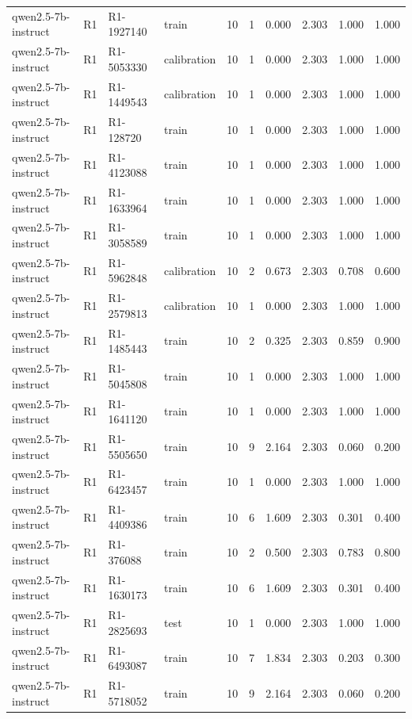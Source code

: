 \begin{table}
\begin{tabular}{llllrrrrrr}
qwen2.5-7b-instruct & R1 & R1-1927140 & train & 10 & 1 & 0.000 & 2.303 & 1.000 & 1.000 \\
qwen2.5-7b-instruct & R1 & R1-5053330 & calibration & 10 & 1 & 0.000 & 2.303 & 1.000 & 1.000 \\
qwen2.5-7b-instruct & R1 & R1-1449543 & calibration & 10 & 1 & 0.000 & 2.303 & 1.000 & 1.000 \\
qwen2.5-7b-instruct & R1 & R1-128720 & train & 10 & 1 & 0.000 & 2.303 & 1.000 & 1.000 \\
qwen2.5-7b-instruct & R1 & R1-4123088 & train & 10 & 1 & 0.000 & 2.303 & 1.000 & 1.000 \\
qwen2.5-7b-instruct & R1 & R1-1633964 & train & 10 & 1 & 0.000 & 2.303 & 1.000 & 1.000 \\
qwen2.5-7b-instruct & R1 & R1-3058589 & train & 10 & 1 & 0.000 & 2.303 & 1.000 & 1.000 \\
qwen2.5-7b-instruct & R1 & R1-5962848 & calibration & 10 & 2 & 0.673 & 2.303 & 0.708 & 0.600 \\
qwen2.5-7b-instruct & R1 & R1-2579813 & calibration & 10 & 1 & 0.000 & 2.303 & 1.000 & 1.000 \\
qwen2.5-7b-instruct & R1 & R1-1485443 & train & 10 & 2 & 0.325 & 2.303 & 0.859 & 0.900 \\
qwen2.5-7b-instruct & R1 & R1-5045808 & train & 10 & 1 & 0.000 & 2.303 & 1.000 & 1.000 \\
qwen2.5-7b-instruct & R1 & R1-1641120 & train & 10 & 1 & 0.000 & 2.303 & 1.000 & 1.000 \\
qwen2.5-7b-instruct & R1 & R1-5505650 & train & 10 & 9 & 2.164 & 2.303 & 0.060 & 0.200 \\
qwen2.5-7b-instruct & R1 & R1-6423457 & train & 10 & 1 & 0.000 & 2.303 & 1.000 & 1.000 \\
qwen2.5-7b-instruct & R1 & R1-4409386 & train & 10 & 6 & 1.609 & 2.303 & 0.301 & 0.400 \\
qwen2.5-7b-instruct & R1 & R1-376088 & train & 10 & 2 & 0.500 & 2.303 & 0.783 & 0.800 \\
qwen2.5-7b-instruct & R1 & R1-1630173 & train & 10 & 6 & 1.609 & 2.303 & 0.301 & 0.400 \\
qwen2.5-7b-instruct & R1 & R1-2825693 & test & 10 & 1 & 0.000 & 2.303 & 1.000 & 1.000 \\
qwen2.5-7b-instruct & R1 & R1-6493087 & train & 10 & 7 & 1.834 & 2.303 & 0.203 & 0.300 \\
qwen2.5-7b-instruct & R1 & R1-5718052 & train & 10 & 9 & 2.164 & 2.303 & 0.060 & 0.200 \\

\end{tabular}
\end{table}
